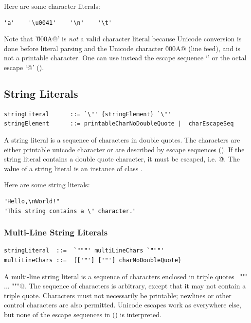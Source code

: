 \example
Here are some character literals:
\begin{lstlisting}
'a'    '\u0041'    '\n'    '\t'
\end{lstlisting}
Note that '\lstinline@\u000A@' is {\em not} a valid character literal because
Unicode conversion is done before literal parsing and the Unicode
character \lstinline@\u000A@ (line feed), and is not a printable
character. One can use instead the escape sequence `\lstinline@\n@' or
the octal escape `\lstinline@{}@' ().

\subsection{String Literals}\label{sec:string-literals}

\syntax\begin{lstlisting}
stringLiteral      ::= `\"' {stringElement} `\"'
stringElement      ::= printableCharNoDoubleQuote |  charEscapeSeq
\end{lstlisting}

A string literal is a sequence of characters in double quotes.  The
characters are either printable unicode character or are described by
escape sequences (). If the string literal
contains a double quote character, it must be escaped,
i.e. \lstinline@\"@. The value of a string literal is an instance of
class \lstinline@String@. 

\example
Here are some string literals:
\begin{lstlisting}
"Hello,\nWorld!"       
"This string contains a \" character."
\end{lstlisting}

\subsubsection*{Multi-Line String Literals}

\syntax\begin{lstlisting}
stringLiteral  ::=  `"""' multiLineChars `"""'
multiLineChars ::=  {['"'] ['"'] charNoDoubleQuote}
\end{lstlisting}

A multi-line string literal is a sequence of characters enclosed in
triple quotes ~\lstinline@""" ... """@. The sequence of characters is
arbitrary, except that it may not contain a triple quote. Characters
must not necessarily be printable; newlines or other
control characters are also permitted.  Unicode escapes work as everywhere else, but none
of the escape sequences in () is interpreted.


